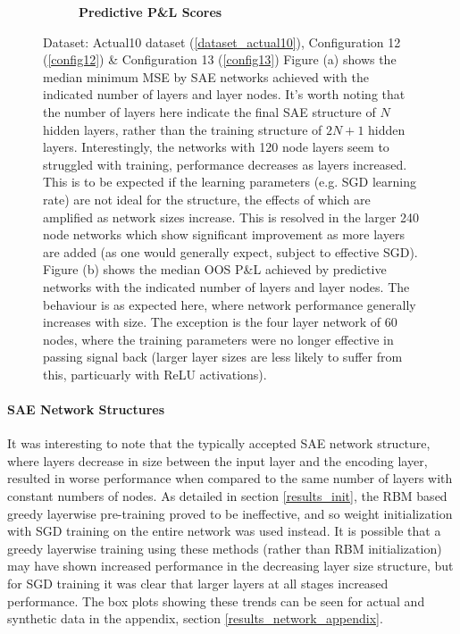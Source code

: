 \documentclass[a4paper,11pt,oneside]{article}
\theoremstyle{plain}
\theoremstyle{definition}
\begin{document}
\begin{figure}[H]
\begin{subfigure}{.5\textwidth}
			\caption{\textbf{Predictive P\&L Scores} 
				\newline }
			\label{figure-actual_pl_lines}
		\end{subfigure}
		\caption[Network Performance by Size]{Dataset: Actual10 dataset (\ref{dataset_actual10}), Configuration 12 (\ref{config12}) \& Configuration 13 (\ref{config13})
			\newline Figure (a) shows the median minimum MSE by SAE networks achieved with the indicated number of layers and layer nodes. It's worth noting that the number of layers here indicate the final SAE structure of $N$ hidden layers, rather than the training structure of $2N + 1$ hidden layers. Interestingly, the networks with 120 node layers seem to struggled with training, performance decreases as layers increased. This is to be expected if the learning parameters (e.g. SGD  learning rate) are not ideal for the structure, the effects of which are amplified as network sizes increase. This is resolved in the larger 240 node networks which show significant improvement as more layers are added (as one would generally expect, subject to effective SGD).
			\newline Figure (b) shows the median OOS P\&L achieved by predictive networks with the indicated number of layers and layer nodes. The behaviour is as expected here, where network performance generally increases with size. The exception is the four layer network of 60 nodes, where the training parameters were no longer effective in passing signal back (larger layer sizes are less likely to suffer from this, particuarly with ReLU activations).
		}
		\label{figure-network_size}
	\end{figure}
	
	\paragraph{SAE Network Structures}
	
	It was interesting to note that the typically accepted SAE network structure, where layers decrease in size between the input layer and the encoding layer, resulted in worse performance when compared to the same number of layers with constant numbers of nodes. As detailed in section \ref{results_init}, the RBM based greedy layerwise pre-training proved to be ineffective, and so weight initialization with SGD training on the entire network was used instead. It is possible that a greedy layerwise training using these methods (rather than RBM initialization) may have shown increased performance in the decreasing layer size structure, but for SGD training it was clear that larger layers at all stages increased performance. The box plots showing these trends can be seen for actual and synthetic data in the appendix, section \ref{results_network_appendix}.
	
\end{document}
